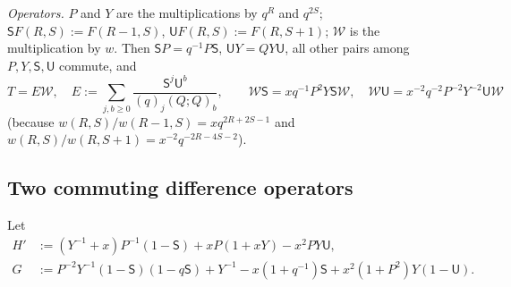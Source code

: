 \documentclass[11pt]{amsart}
\theoremstyle{definition}
\numberwithin{equation}{section}
\begin{document}
\emph{Operators.} $P$ and $Y$ are the multiplications by $q^R$ and $q^{2S}$; $\mathsf SF(R,S):=F(R-1,S)$,
$\mathsf UF(R,S):=F(R,S+1)$; $\mathcal W$ is the multiplication by $w$. Then $\mathsf SP=q^{-1}P\mathsf S$,
$\mathsf UY=QY\mathsf U$, all other pairs among $P,Y,\mathsf S,\mathsf U$ commute, and
\begin{equation}\label{eq:TEW}
T=E\mathcal W,\quad E:=\sum_{j,b\ge0}\frac{\mathsf S^j\mathsf U^b}{(q)_j(Q;Q)_b},\qquad
\mathcal W\mathsf S=xq^{-1}P^2Y\mathsf S\mathcal W,\quad \mathcal W\mathsf U=x^{-2}q^{-2}P^{-2}Y^{-2}\mathsf U\mathcal W
\end{equation}
(because $w(R,S)/w(R-1,S)=xq^{2R+2S-1}$ and $w(R,S)/w(R,S+1)=x^{-2}q^{-2R-4S-2}$).

\subsection{Two commuting difference operators}\label{ssec:comm}
Let
\begin{align*}
H'&:=(Y^{-1}+x)P^{-1}(1-\mathsf S)+xP(1+xY)-x^2PY\mathsf U,\\
G&:=P^{-2}Y^{-1}(1-\mathsf S)(1-q\mathsf S)+Y^{-1}-x(1+q^{-1})\mathsf S+x^2(1+P^2)Y(1-\mathsf U).
\end{align*}
\end{document}

